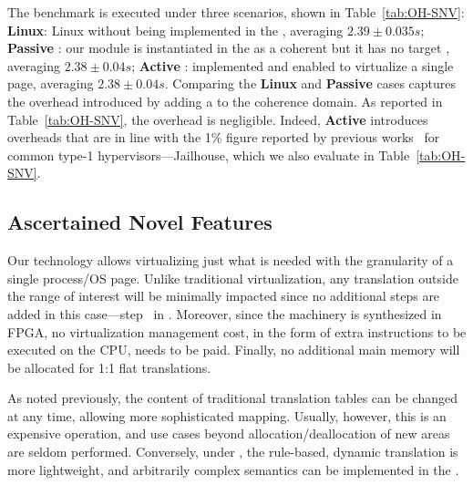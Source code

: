         The benchmark is executed under three scenarios, shown in Table~\ref{tab:OH-SNV}:
        \textbf{Linux}: Linux without \sname being implemented in the \fpga, averaging  $2.39 \pm 0.035s$; 
        \textbf{Passive \sname}: our \sname module is instantiated in the \fpga as a coherent {\master} but it has no target , averaging $2.38 \pm 0.04s$;
        \textbf{Active \sname}: \sname implemented and enabled to virtualize a single page, averaging $2.38 \pm 0.04s$.
        Comparing the \textbf{Linux} and \textbf{Passive \sname} cases captures the overhead introduced by adding a {\master} to the coherence domain.
        As reported in Table~\ref{tab:OH-SNV}, the overhead is negligible.
        Indeed, \textbf{Active \sname} introduces overheads that are in line with the 1\% figure reported by previous works~\cite{shedding-light} for common type-1 hypervisors---\eg Jailhouse, which we also evaluate in Table~\ref{tab:OH-SNV}.
    
    \subsection{Ascertained Novel Features}
    
            Our technology allows virtualizing just what is needed with the granularity of a single process/OS page. Unlike traditional virtualization, any translation outside the range of interest will be minimally impacted since no additional steps are added in this case---step~ in .
            Moreover, since the \sname machinery is synthesized in FPGA, no virtualization management cost, in the form of extra instructions to be executed on the CPU, needs to be paid.
            Finally, no additional main memory will be allocated for 1:1 flat translations.
        
            As noted previously, the content of traditional translation tables can be changed at any time, allowing more sophisticated mapping.
            Usually, however, this is an expensive operation, and use cases beyond allocation/deallocation of new areas are seldom performed.
            Conversely, under \sname, the rule-based, dynamic translation is more lightweight, and arbitrarily complex semantics can be implemented in the \fpga.
    